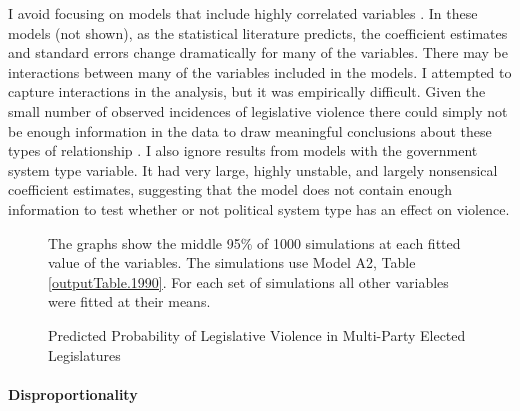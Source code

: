 \documentclass[a4paper]{article}\usepackage[]{graphicx}\usepackage[]{color}
\makeatletter
\newenvironment{kframe}{%
 \def\at@end@of@kframe{}%
 \ifinner\ifhmode%
  \def\at@end@of@kframe{\end{minipage}}%
  \begin{minipage}{\columnwidth}%
 \fi\fi%
 \def\FrameCommand##1{\hskip\@totalleftmargin \hskip-\fboxsep
 \colorbox{shadecolor}{##1}\hskip-\fboxsep
     \hskip-\linewidth \hskip-\@totalleftmargin \hskip\columnwidth}%
 \MakeFramed {\advance\hsize-\width
   \@totalleftmargin\z@ \linewidth\hsize
   \@setminipage}}%
 {\par\unskip\endMakeFramed%
 \at@end@of@kframe}
\newenvironment{knitrout}{}{} %
\makeatother
\begin{document}
I avoid focusing on models that include highly correlated variables \citep[see][]{Achen2002, Schrodt2006}. In these models (not shown), as the statistical literature predicts, the coefficient estimates and standard errors change dramatically for many of the variables. There may be interactions between many of the variables included in the models. I attempted to capture interactions in the analysis, but it was empirically difficult. Given the small number of observed incidences of legislative violence there could simply not be enough information in the data to draw meaningful conclusions about these types of relationship \citep[see][]{Brambor2006}. I also ignore results from models with the government system type variable. It had very large, highly unstable, and largely nonsensical coefficient estimates, suggesting that the model does not contain enough information to test \citep{Babyak2004} whether or not political system type has an effect on violence.

\begin{figure}[t]
    \caption{Predicted Probability of Legislative Violence in Multi-Party Elected Legislatures}
    \label{pred_prob}
    \begin{center}


\begin{knitrout}
\color{fgcolor}\begin{kframe}


{\ttfamily\noindent\bfseries{}}\end{kframe}
\end{knitrout}
    \end{center}
    \begin{singlespace}
      {\scriptsize{The graphs show the middle 95\% of 1000 simulations at each fitted value of the variables. The simulations use Model A2, Table \ref{outputTable.1990}. For each set of simulations all other variables were fitted at their means.}}
    \end{singlespace}
\end{figure}

\paragraph{Disproportionality}
\end{document}
